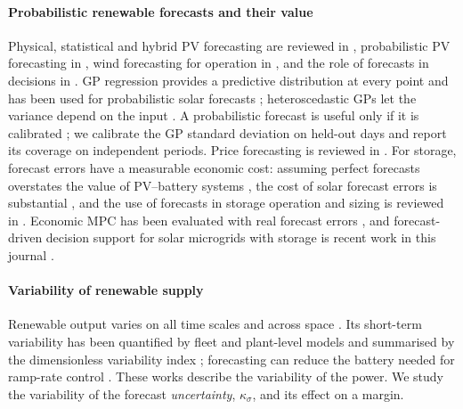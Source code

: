 \documentclass[a4paper,fleqn]{cas-dc}
\begin{document}
\paragraph{Probabilistic renewable forecasts and their value} Physical, statistical and hybrid PV forecasting are reviewed in \cite{antonanzas2016review,voyant2017machine}, probabilistic PV forecasting in \cite{vandermeer2018review}, wind forecasting for operation in \cite{pinson2013wind}, and the role of forecasts in decisions in \cite{hong2016probabilistic,sweeney2020future}. GP regression provides a predictive distribution at every point \cite{rasmussen2006gaussian} and has been used for probabilistic solar forecasts \cite{najibi2021enhanced}; heteroscedastic GPs let the variance depend on the input \cite{kersting2007most}. A probabilistic forecast is useful only if it is calibrated \cite{gneiting2007probabilistic,gneiting2007scoring}; we calibrate the GP standard deviation on held-out days and report its coverage on independent periods. Price forecasting is reviewed in \cite{weron2014electricity,lago2021forecasting}. For storage, forecast errors have a measurable economic cost: assuming perfect forecasts overstates the value of PV--battery systems \cite{mirletz2023impacts}, the cost of solar forecast errors is substantial \cite{gandhi2024value}, and the use of forecasts in storage operation and sizing is reviewed in \cite{sharma2021use,seervi2021renewable}. Economic MPC has been evaluated with real forecast errors \cite{manzano2022economic}, and forecast-driven decision support for solar microgrids with storage is recent work in this journal \cite{tariq2026pvforecasting}.

\paragraph{Variability of renewable supply} Renewable output varies on all time scales and across space \cite{widen2015variability,engeland2017spacetime,krakauer2017interannual}. Its short-term variability has been quantified by fleet and plant-level models \cite{hoff2010quantifying,mills2010implications,lave2013wavelet} and summarised by the dimensionless variability index \cite{stein2012variability}; forecasting can reduce the battery needed for ramp-rate control \cite{gonzalezmoreno2022pv}. These works describe the variability of the power. We study the variability of the forecast \emph{uncertainty}, $\kappa_\sigma$, and its effect on a margin.
\end{document}
